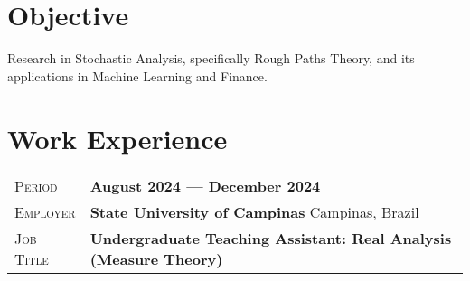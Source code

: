 \documentclass[a4paper, oneside, final]{scrartcl} %
\newcommand{\gray}{\rowcolor[gray]{.90}} %
\begin{document}
\begin{center} %


{\fontsize{22}{22}\selectfont\scshape{}} %

\vspace{0.5cm} %


\section{Objective}

Research in Stochastic Analysis, specifically Rough Paths Theory, and its applications in Machine Learning and Finance.


\section{Work Experience}

\begin{tabularx}{0.97\linewidth}{>{\raggedleft\scshape}p{2cm}X}
\gray Period & \textbf{August 2024 --- December 2024}\\
\gray Employer & \textbf{State University of Campinas} \hfill Campinas, Brazil\\
\gray Job Title & \textbf{Undergraduate Teaching Assistant: Real Analysis (Measure Theory)}
\end{tabularx}
       

\end{center}
\end{document}
